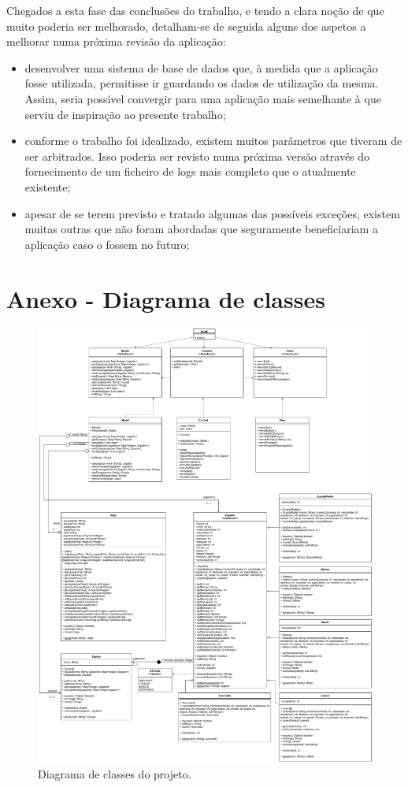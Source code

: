 \documentclass[11pt]{article}
\begin{document}
Chegados a esta fase das conclusões do trabalho, e tendo a clara noção de que muito poderia ser melhorado, detalham-se de seguida alguns dos aspetos a melhorar numa próxima revisão da aplicação:

\begin{itemize}

\item desenvolver uma sistema de base de dados que, à medida que a aplicação fosse utilizada, permitisse ir guardando os dados de utilização da mesma. Assim, seria possível convergir para uma aplicação mais semelhante à que serviu de inspiração ao presente trabalho;

\item conforme o trabalho foi idealizado, existem muitos parâmetros que tiveram de ser arbitrados. Isso poderia ser revisto numa próxima versão através do fornecimento de um ficheiro de logs mais completo que o atualmente existente;

\item apesar de se terem previsto e tratado algumas das possíveis exceções, existem muitas outras que não foram abordadas que seguramente beneficiariam a aplicação caso o fossem no futuro;

\end{itemize}

\newpage

\section*{Anexo - Diagrama de classes}

\begin{figure}[!h]
	\centering
	\includegraphics[height=0.8\textheight]{Diagrama.pdf}
	\caption{Diagrama de classes do projeto.}
	\label{fig:diagramaClasses}
\end{figure}
\end{document}
